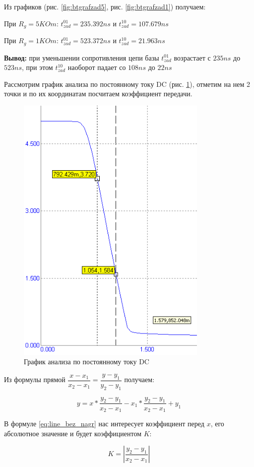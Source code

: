 \documentclass[a4paper,14pt]{article}
\begin{document}
Из графиков (рис. \ref{fig:btgrafzad5}, рис. \ref{fig:btgrafzad1}) получаем:

При $R_g = 5KOm$: $t^{01}_{zad} = 235.392ns$ и $t^{10}_{zad} = 107.679ns$

При $R_g = 1KOm$: $t^{01}_{zad} = 523.372ns$ и $t^{10}_{zad} = 21.963ns$

\textbf{Вывод:} при уменьшении сопротивления цепи базы $t^{01}_{zad}$ возрастает с $235ns$ до $523ns$, при этом  $t^{10}_{zad}$ наоборот падает со $108ns$ до $22ns$ 


Рассмотрим график анализа по постоянному току DC (рис. \ref{fig:btdc}), отметим на нем 2 точки и по их координатам посчитаем коэффициент передачи.

\begin{figure}[H]
	\centering
	\includegraphics[width=0.4\linewidth]{image/BT_DC}
	\caption{График анализа по постоянному току DC}
	\label{fig:btdc}
\end{figure}

Из формулы прямой $\dfrac{x-x_1}{x_2 - x_1} = \dfrac{y-y_1}{y_2 - y_1}$ получаем:


\begin{equation}
y = x * \dfrac{y_2 - y_1}{x_2 - x_1} - x_1 * \dfrac{y_2 - y_1}{x_2 - x_1} + y_1
\label{eq:line_bez_nagr}
\end{equation}

В формуле \ref{eq:line_bez_nagr} нас интересует коэффициент перед $x$, его абсолютное значение и будет коэффициентом $K$: 

\begin{equation}
K = \left|\dfrac{y_2 - y_1}{x_2 - x_1}\right|
\label{eq:K_bez_nagr}
\end{equation}
\end{document}
